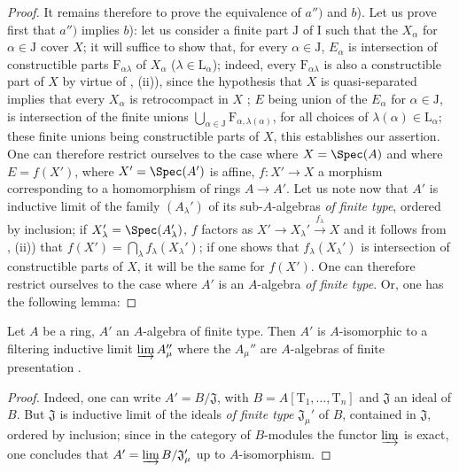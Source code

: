 \begin{proof}
It remains therefore to prove the equivalence of $a'')$ and $b$).
Let us prove first that $a'')$ implies $b$): let us consider a finite part $\mathrm{J}$ of $\mathrm{I}$ such that the $X_\alpha$ for $\alpha\in\mathrm{J}$ cover $X$; it will suffice to show that, for every $\alpha\in\mathrm{J}$, $E_\alpha$ is intersection of constructible parts $\mathrm{F}_{\alpha\lambda}$ of $X_\alpha$ ($\lambda\in\mathrm{L}_\alpha$); indeed, every $\mathrm{F}_{\alpha\lambda}$ is also a constructible part of $X$ by virtue of , (ii)), since the hypothesis that $X$ is quasi-separated implies that every $X_\alpha$ is retrocompact in $X$ ; $E$ being union of the $E_\alpha$ for $\alpha\in\mathrm{J}$, is intersection of the finite unions $\bigcup_{\alpha\in\mathrm{J}} \mathrm{F}_{\alpha,\lambda(\alpha)}$, for all choices of $\lambda(\alpha)\in\mathrm{L}_\alpha$; these finite unions being constructible parts of $X$, this establishes our assertion.
One can therefore restrict ourselves to the case
where $X=\Spec(A)$ and where $E=f(X')$, where $X'=\Spec(A')$ is affine, $f:X'\to X$ a morphism corresponding to a homomorphism of rings $A\to A'$.
Let us note now that $A'$ is inductive limit of the family $(A_\lambda')$ of its sub-$A$-algebras \emph{of finite type}, ordered by inclusion; if $X_\lambda'=\Spec(A_\lambda')$, $f$ factors as $X'\to X_\lambda'\xrightarrow{f_\lambda} X$ and it follows from , (ii)) that $f(X')=\bigcap_\lambda f_\lambda(X_\lambda')$; if one shows that $f_\lambda(X_\lambda')$ is intersection of constructible parts of $X$, it will be the same for $f(X')$.
One can therefore restrict ourselves to the case where $A'$ is an $A$-algebra \emph{of finite type}.
Or, one has the following lemma:
\end{proof}

\begin{lemma}[1.9.3.1]
\label{IV.1.9.3.1}
Let $A$ be a ring, $A'$ an $A$-algebra of finite type.
Then $A'$ is $A$-isomorphic to a filtering inductive limit $\varinjlim A_\mu''$ where the $A_\mu''$ are $A$-algebras of finite presentation .
\end{lemma}

\begin{proof}
Indeed, one can write $A'=B/\mathfrak{J}$, with $B=A[\mathrm{T}_1,\ldots,\mathrm{T}_n]$ and $\mathfrak{J}$ an ideal of $B$.
But $\mathfrak{J}$ is inductive limit of the ideals \emph{of finite type} $\mathfrak{J}_\mu'$ of $B$, contained in $\mathfrak{J}$, ordered by inclusion; since in the category of $B$-modules the functor $\varinjlim$ is exact, one concludes that $A'=\varinjlim B/\mathfrak{J}_\mu'$ up to $A$-isomorphism.
\end{proof}

